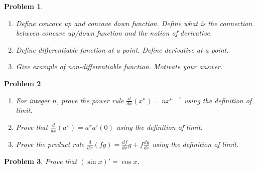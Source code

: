 \documentclass{article}
\newtheorem{problem}{Problem}
\begin{document}
\begin{problem} ~
\begin{enumerate}
\item Define concave up and concave down function. Define what is the connection between concave up/down function and the notion of derivative.
\item Define differentiable function at a point. Define derivative at a point.

\item Give example of non-differentiable function. Motivate your answer.
\end{enumerate}
\end{problem}
\begin{problem}~
\begin{enumerate}
\item For integer $n$, prove the power rule $\frac{d}{dx}(x^n)=n x^{n-1} $ using the definition of limit.
\item Prove that $\frac{d}{dx} (a^x) = a^x a'(0)$ using the definition of limit.
\item Prove the product rule $\frac{d}{dx} (f g)= \frac{df}{dx} g+ f \frac{dg}{dx} $ using the definition of limit.
\end{enumerate}
\end{problem}
\begin{problem}
Prove that $(\sin x)'=\cos x$.
\end{problem}
\end{document}
